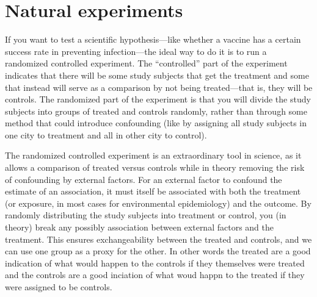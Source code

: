 \documentclass[
]{book}
\begin{document}
\hypertarget{natural-experiments-1}{%
\section{Natural experiments}\label{natural-experiments-1}}

If you want to test a scientific hypothesis---like whether a vaccine has a certain success rate in preventing infection---the ideal way to do it is to run a randomized controlled experiment. The ``controlled'' part of the experiment indicates that there will be some study subjects that get the treatment and some that instead will serve as a comparison by not being treated---that is, they will be controls. The randomized part of the experiment is that you will divide the study subjects into groups of treated and controls randomly, rather than through some method that could introduce confounding (like by assigning all study subjects in one city to treatment and all in other city to control).

The randomized controlled experiment is an extraordinary tool in science, as it allows a comparison of treated versus controls while in theory removing the risk of confounding by external factors. For an external factor to confound the estimate of an association, it must itself be associated with both the treatment (or exposure, in most cases for environmental epidemiology) and the outcome. By randomly distributing the study subjects into treatment or control, you (in theory) break any possibly association between external factors and the treatment. This ensures exchangeability between the treated and controls, and we can use one group as a proxy for the other. In other words the treated are a good indication of what would happen to the controls if they themselves were treated and the controls are a good inciation of what woud happn to the treated if they were assigned to be controls.
\end{document}
